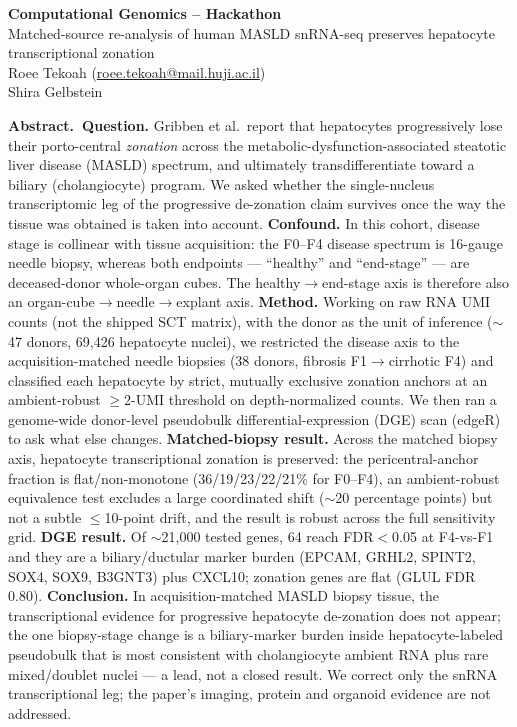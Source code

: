 \documentclass[11pt,a4paper]{article}
\begin{document}
\begin{center}
  {\Large\bfseries Computational Genomics -- Hackathon}\\[0.4em]
  {\large Matched-source re-analysis of human MASLD snRNA-seq preserves hepatocyte transcriptional zonation}\\[0.7em]
  Roee Tekoah \quad(\href{mailto:roee.tekoah@mail.huji.ac.il}{roee.tekoah@mail.huji.ac.il})\\[0.2em]
  Shira Gelbstein
\end{center}
\vspace{0.4em}

{\small\noindent\textbf{Abstract.~}\textbf{Question.} Gribben et al.\ report that hepatocytes progressively lose their porto-central \emph{zonation} across the metabolic-dysfunction-associated steatotic liver disease (MASLD) spectrum, and ultimately transdifferentiate toward a biliary (cholangiocyte) program. We asked whether the single-nucleus transcriptomic leg of the progressive de-zonation claim survives once the way the tissue was obtained is taken into account. \textbf{Confound.} In this cohort, disease stage is collinear with tissue acquisition: the F0--F4 disease spectrum is 16-gauge needle biopsy, whereas both endpoints --- ``healthy'' and ``end-stage'' --- are deceased-donor whole-organ cubes. The healthy$\to$end-stage axis is therefore also an organ-cube$\to$needle$\to$explant axis. \textbf{Method.} Working on raw RNA UMI counts (not the shipped SCT matrix), with the donor as the unit of inference ($\sim$47 donors, 69{,}426 hepatocyte nuclei), we restricted the disease axis to the acquisition-matched needle biopsies (38 donors, fibrosis F1$\to$cirrhotic F4) and classified each hepatocyte by strict, mutually exclusive zonation anchors at an ambient-robust $\ge$2-UMI threshold on depth-normalized counts. We then ran a genome-wide donor-level pseudobulk differential-expression (DGE) scan (edgeR) to ask what else changes. \textbf{Matched-biopsy result.} Across the matched biopsy axis, hepatocyte transcriptional zonation is preserved: the pericentral-anchor fraction is flat/non-monotone (36/19/23/22/21\% for F0--F4), an ambient-robust equivalence test excludes a large coordinated shift ($\sim$20 percentage points) but not a subtle $\le$10-point drift, and the result is robust across the full sensitivity grid. \textbf{DGE result.} Of $\sim$21{,}000 tested genes, 64 reach FDR$<$0.05 at F4-vs-F1 and they are a biliary/ductular marker burden (EPCAM, GRHL2, SPINT2, SOX4, SOX9, B3GNT3) plus CXCL10; zonation genes are flat (GLUL FDR 0.80). \textbf{Conclusion.} In acquisition-matched MASLD biopsy tissue, the transcriptional evidence for progressive hepatocyte de-zonation does not appear; the one biopsy-stage change is a biliary-marker burden inside hepatocyte-labeled pseudobulk that is most consistent with cholangiocyte ambient RNA plus rare mixed/doublet nuclei --- a lead, not a closed result. We correct only the snRNA transcriptional leg; the paper's imaging, protein and organoid evidence are not addressed.}\par\vspace{0.5em}
\end{document}
